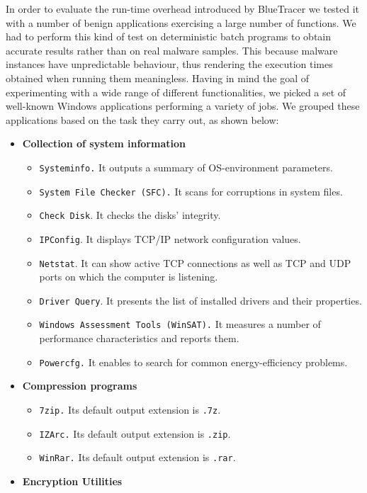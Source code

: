 In order to evaluate the run-time overhead introduced by BlueTracer we tested it with a number of benign applications exercising a large number of functions. We had to perform this kind of test on deterministic batch programs to obtain accurate results rather than on real malware samples. This because malware instances have unpredictable behaviour, thus rendering the execution times obtained when running them meaningless.
Having in mind the goal of experimenting with a wide range of different functionalities, we picked a set of well-known Windows applications performing a variety of jobs. We grouped these applications based on the task they carry out, as shown below:

\begin{itemize}
\item \textbf{Collection of system information}
	   \begin{itemize}
	   \item \texttt{Systeminfo.} It outputs a summary of OS-environment parameters. 
	   \item \texttt{System File Checker (SFC).} It scans for corruptions in system files.
	   \item \texttt{Check Disk}. It checks the disks' integrity.
	   \item \texttt{IPConfig}. It displays TCP/IP network configuration values.
	   \item \texttt{Netstat}. It can show active TCP connections as well as TCP and UDP ports on which the computer is listening.
	   \item \texttt{Driver Query}. It presents the list of installed drivers and their properties.
	   \item \texttt{Windows Assessment Tools (WinSAT).} It  measures a number of performance characteristics and reports them.
	   \item \texttt{Powercfg.} It enables to search for common energy-efficiency problems. 
	   \end{itemize}
\item \textbf{Compression programs}
		\begin{itemize}
		\item \texttt{7zip.} Its default output extension is \texttt{.7z}.
		\item \texttt{IZArc.} Its default output extension is \texttt{.zip}.
		\item \texttt{WinRar.} Its default output extension is \texttt{.rar}.
		\end{itemize}
\item \textbf{Encryption Utilities}

\end{itemize}
